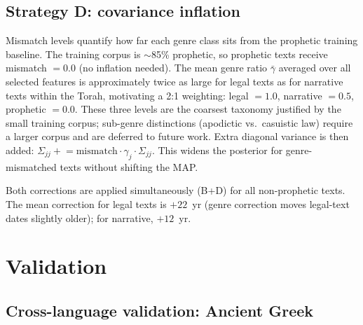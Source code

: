 \documentclass[10pt,letterpaper]{article}
\begin{document}
\subsection*{Strategy D: covariance inflation}

Mismatch levels quantify how far each genre class sits from the
prophetic training baseline.  The training corpus is $\sim$85\%
prophetic, so prophetic texts receive mismatch $= 0.0$ (no inflation
needed).  The mean genre ratio $\bar{\gamma}$ averaged over all selected
features is approximately twice as large for legal texts as for narrative
texts within the Torah, motivating a 2:1 weighting: legal $= 1.0$,
narrative $= 0.5$, prophetic $= 0.0$.  These three levels are the
coarsest taxonomy justified by the small training corpus; sub-genre
distinctions (apodictic vs.\ casuistic law) require a larger corpus and
are deferred to future work.  Extra diagonal variance is then added:
$\Sigma_{jj} \mathrel{+}= \text{mismatch} \cdot \gamma_j \cdot \Sigma_{jj}$.
This widens the posterior for genre-mismatched texts without shifting the MAP.

Both corrections are applied simultaneously (B+D) for all non-prophetic
texts.  The mean correction for legal texts is $+22$~yr (genre correction
moves legal-text dates slightly older); for narrative, $+12$~yr.

\section*{Validation}

\subsection*{Cross-language validation: Ancient Greek}
\end{document}
